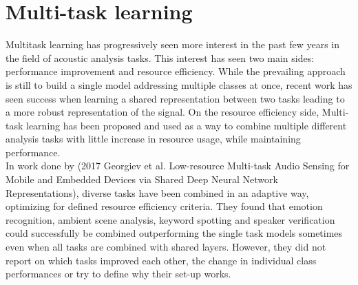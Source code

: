 	
	\section{Multi-task learning}
	Multitask learning has progressively seen more interest in the past few years in the field of acoustic analysis tasks. This interest has seen two main sides: performance improvement and resource efficiency.  While the prevailing approach is still to build a single model addressing multiple classes at once, recent work has seen success when learning a shared representation between two tasks leading to a more robust representation of the signal. On the resource efficiency side, Multi-task learning has been proposed and used as a way to combine multiple different analysis tasks with little increase in resource usage, while maintaining performance.\\
	
	In work done by (2017 Georgiev et al. Low-resource Multi-task Audio Sensing for Mobile and Embedded Devices via Shared Deep Neural Network Representations), diverse tasks have been combined in an adaptive way, optimizing for defined resource efficiency criteria. They found that emotion recognition, ambient scene analysis, keyword spotting and speaker verification could successfully be combined outperforming the single task models sometimes even when all tasks are combined with shared layers. However, they did not report on which tasks improved each other, the change in individual class performances or try to define why their set-up works.\\
	
